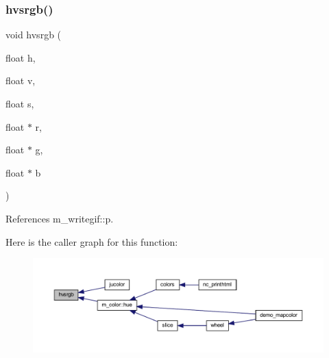 \subsubsection{\texorpdfstring{hvsrgb()}{hvsrgb()}}
{\footnotesize\ttfamily void hvsrgb (\begin{DoxyParamCaption}\item[{float}]{h,  }\item[{float}]{v,  }\item[{float}]{s,  }\item[{float $\ast$}]{r,  }\item[{float $\ast$}]{g,  }\item[{float $\ast$}]{b }\end{DoxyParamCaption})}



References m\+\_\+writegif\+::p.

Here is the caller graph for this function\+:
\nopagebreak
\begin{figure}[H]
\begin{center}
\leavevmode
\includegraphics[width=350pt]{C-hvsrgb_8c_a3e696875abb711e0bda0e666bf6828e3_icgraph}
\end{center}
\end{figure}
